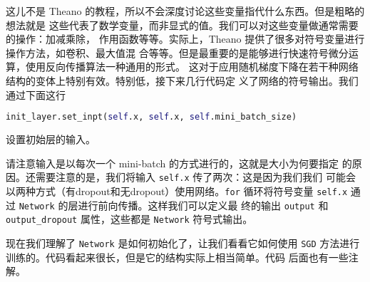 这儿不是 Theano 的教程，所以不会深度讨论这些变量指代什么东西。但是粗略的想法就是
这些代表了数学变量，而非显式的值。我们可以对这些变量做通常需要的操作：加减乘除，
作用函数等等。实际上，Theano 提供了很多对符号变量进行操作方法，如卷积、最大值混
合等等。但是最重要的是能够进行快速符号微分运算，使用反向传播算法一种通用的形式。
这对于应用随机梯度下降在若干种网络结构的变体上特别有效。特别低，接下来几行代码定
义了网络的符号输出。我们通过下面这行

\begin{lstlisting}[language=Python]
init_layer.set_inpt(self.x, self.x, self.mini_batch_size)
\end{lstlisting}

设置初始层的输入。

请注意输入是以每次一个 mini-batch 的方式进行的，这就是\minibatch{}大小为何要指定
的原因。还需要注意的是，我们将输入 \lstinline!self.x! 传了两次：这是因为我们我们
可能会以两种方式（有dropout和无dropout）使用网络。\lstinline!for! 循环将符号变量
\lstinline!self.x! 通过 \lstinline!Network! 的层进行前向传播。这样我们可以定义最
终的输出 \lstinline!output! 和 \lstinline!output_dropout! 属性，这些都是
\lstinline!Network! 符号式输出。

现在我们理解了 \lstinline!Network! 是如何初始化了，让我们看看它如何使用
\lstinline!SGD! 方法进行训练的。代码看起来很长，但是它的结构实际上相当简单。代码
后面也有一些注解。


